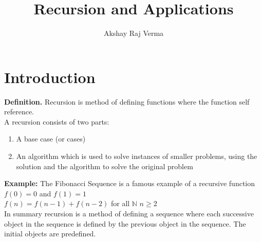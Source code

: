 \documentclass{article}
\begin{document}
\lstset{language=C}
\title{Recursion and Applications}
\author{Akshay Raj Verma}
\maketitle
\section{Introduction}
{\bf Definition.} Recursion is method of defining functions where the function self reference. 
\\
A recursion consists of two parts:
\begin{enumerate}
	\item A base case (or cases)
	\item An algorithm which is used to solve instances of smaller problems, using the solution and the algorithm to solve the original problem
\end{enumerate}
{\bf Example:} The Fibonacci Sequence is a famous example of a recursive function\\
\hspace{10mm}{\bf Base Case:}  \hspace{10mm}$f(0)=0$ and $f(1)=1$
\\
\hspace{10mm}{\bf Formula:} \hspace{11mm} $f(n)=f(n-1)+f(n-2)$ for all $\mathbb{N}$ $ n \geq 2$
\\
In summary recursion is a method of defining a sequence where each successive object in the sequence is defined by the previous object in the sequence.  The initial objects are predefined.
\end{document}
